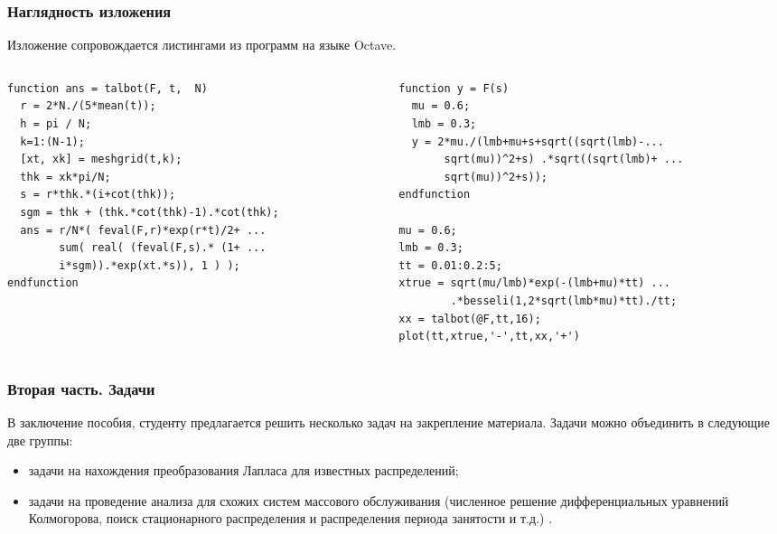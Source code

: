\documentclass[10pt]{beamer}
\begin{document}
\begin{frame}[fragile]
\frametitle{Наглядность изложения}


Изложение сопровождается листингами из программ на языке Octave.
\medskip
\begin{columns}[T]
\begin{column}{0.5\textwidth}
\begin{Verbatim}[fontsize=\scriptsize,label=Обращение преобразования Лапласа,frame=single]
function ans = talbot(F, t,  N)
  r = 2*N./(5*mean(t));
  h = pi / N;
  k=1:(N-1);
  [xt, xk] = meshgrid(t,k);
  thk = xk*pi/N;
  s = r*thk.*(i+cot(thk));
  sgm = thk + (thk.*cot(thk)-1).*cot(thk);
  ans = r/N*( feval(F,r)*exp(r*t)/2+ ...
        sum( real( (feval(F,s).* (1+ ...
        i*sgm)).*exp(xt.*s)), 1 ) );
endfunction
\end{Verbatim}
\end{column}
\begin{column}{0.5\textwidth}
\begin{Verbatim}[fontsize=\scriptsize,label=Конкретное распределение,frame=single]
function y = F(s)
  mu = 0.6;
  lmb = 0.3;
  y = 2*mu./(lmb+mu+s+sqrt((sqrt(lmb)-...
       sqrt(mu))^2+s) .*sqrt((sqrt(lmb)+ ...
       sqrt(mu))^2+s));
endfunction

mu = 0.6;
lmb = 0.3;
tt = 0.01:0.2:5;
xtrue = sqrt(mu/lmb)*exp(-(lmb+mu)*tt) ...
        .*besseli(1,2*sqrt(lmb*mu)*tt)./tt;
xx = talbot(@F,tt,16);
plot(tt,xtrue,'-',tt,xx,'+')
\end{Verbatim}
\end{column}
\end{columns}
\end{frame}

\begin{frame}[fragile]
\frametitle{Вторая часть. Задачи}

В заключение пособия, студенту предлагается решить несколько задач на закрепление материала. Задачи можно объединить в следующие две группы:
\begin{itemize}
    \item задачи на нахождения преобразования Лапласа для известных распределений;
    \item задачи на проведение анализа для схожих систем массового обслуживания (численное решение дифференциальных уравнений Колмогорова, поиск стационарного распределения и распределения периода занятости и т.д.) .
\end{itemize}

\end{frame}
\end{document}
